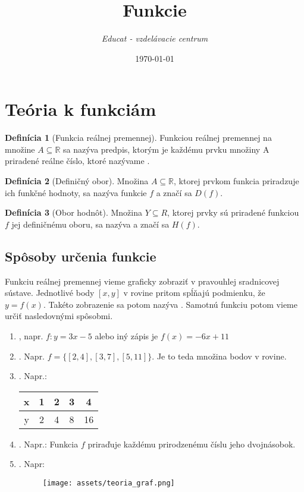 \documentclass[12pt, twopage]{article}
\title{\textbf{Funkcie}}
\date{\today}
\author{\textit{Educat - vzdelávacie centrum}}
\theoremstyle{definition}
\newtheorem{definition}{Definícia}
\begin{document}
	\maketitle
	
	
	\section{Teória k funkciám}
	\begin{definition}[Funkcia reálnej premennej]
		Funkciou reálnej premennej na množine $A \subseteq \mathbb{R}$ sa nazýva predpis, ktorým je každému prvku množiny A priradené  reálne číslo, ktoré nazývame .
	\end{definition}
	
	\begin{definition}[Definičný obor]
		Množina $A \subseteq \mathbb{R}$, ktorej prvkom funkcia priradzuje ich funkčné hodnoty, sa nazýva  funkcie $f$ a značí sa $D(f)$.
	\end{definition}
	
	\begin{definition}[Obor hodnôt]
		Množina $Y \subseteq R$, ktorej prvky sú priradené funkciou $f$ jej definičnému oboru, sa nazýva  a značí sa $H(f)$.
	\end{definition}
	
	\subsection{Spôsoby určenia funkcie}
	
	Funkciu reálnej premennej vieme graficky zobraziť v pravouhlej sradnicovej sústave. Jednotlivé body $[x, y]$ v rovine pritom spĺňajú podmienku, že $y = f(x)$. Takéto zobrazenie sa potom nazýva . Samotnú funkciu potom vieme určiť nasledovnými spôsobmi. 
	
	\begin{enumerate}
		\item {}, napr. $f: y = 3x - 5$ alebo iný zápis je $f(x) = -6x + 11$
		\item {}. Napr. $f = \{[2, 4], [3, 7], [5, 11]\}$. Je to teda množina bodov v rovine.
		\item {}. Napr.: \\
		\begin{tabular}{|c|c|c|c|c|}
			\hline
			x & 1 & 2 & 3 & 4 \\
			\hline
			y & 2 & 4 & 8 & 16\\
			\hline
		\end{tabular}
		\item {}. Napr.: Funkcia $f$ priraďuje každému prirodzenému číslu jeho dvojnásobok.
		\item {}. Napr:\\
		\begin{figure}[h]
			\texttt{[image: assets/teoria\_graf.png]}
		\end{figure}
	\end{enumerate}
	
\end{document}
